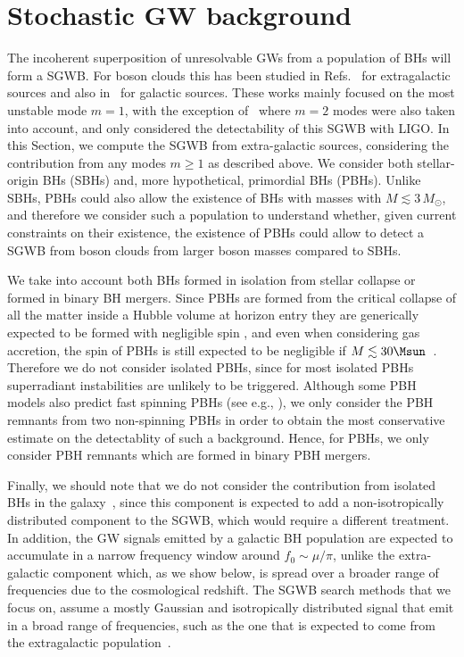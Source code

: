 \documentclass[
reprint,           %
superscriptaddress,%
amsmath,           %
amssymb,           %
aps,               %
prd,               %
notitlepage,       %
floatfix,          %
nofootinbib %
]{revtex4-1}
\begin{document}
\section{Stochastic GW background}

The incoherent superposition of unresolvable GWs from a population of BHs will form a SGWB. For boson clouds this has been studied in Refs.~\cite{Brito:2017wnc,Tsukada:2018mbp,Tsukada:2020lgt} for extragalactic sources and also in~\cite{Zhu:2020tht} for galactic sources. These works mainly focused on the most unstable mode $m=1$, with the exception of~\cite{Tsukada:2020lgt} where $m=2$ modes were also taken into account, and only considered the detectability of this SGWB with LIGO. 
%
In this Section, we compute the SGWB from extra-galactic sources, considering the contribution from any modes $m\geq 1$ as described above. We consider both stellar-origin BHs (SBHs) and, more hypothetical, primordial BHs (PBHs). Unlike SBHs, PBHs could also allow the existence of BHs with masses with $M\lesssim 3\, M_{\odot}$, and therefore we consider such a population to understand whether, given current constraints on their existence, the existence of PBHs could allow to detect a SGWB from boson clouds from larger boson masses compared to SBHs.

We take into account both BHs formed in isolation from stellar collapse or formed in binary BH mergers. Since PBHs are formed from the critical collapse of all the matter inside a Hubble volume at horizon entry \cite{Hawking:1971ei,Carr:1974nx} they are generically expected to be formed with negligible spin \cite{Chiba:2017rvs,DeLuca:2019buf}, and even when considering gas accretion, the spin of PBHs is still expected to be negligible if $M\lesssim 30\Msun$~\cite{DeLuca:2020bjf}. Therefore we do not consider isolated PBHs, since for most isolated PBHs superradiant instabilities are unlikely to be triggered. Although some PBH models also predict fast spinning PBHs (see e.g., \cite{Cotner:2019ykd}), we only consider the PBH remnants from two non-spinning PBHs in order to obtain the most conservative estimate on the detectablity of such a background. Hence, for PBHs, we only consider PBH remnants which are formed in binary PBH mergers.

Finally, we should note that we do not consider the contribution from isolated BHs in the galaxy~\cite{Zhu:2020tht}, since this component is expected to add a non-isotropically distributed component to the SGWB, which would require a different treatment. In addition, the GW signals emitted by a galactic BH population are expected to accumulate in a narrow frequency window around $f_0\sim \mu/\pi$, unlike the extra-galactic component which, as we show below, is spread over a broader range of frequencies due to the cosmological redshift. The SGWB search methods that we focus on, assume a mostly Gaussian and isotropically distributed signal that emit in a broad range of frequencies, such as the one that is expected to come from the extragalactic population~\cite{Tsukada:2020lgt}. 
\end{document}
